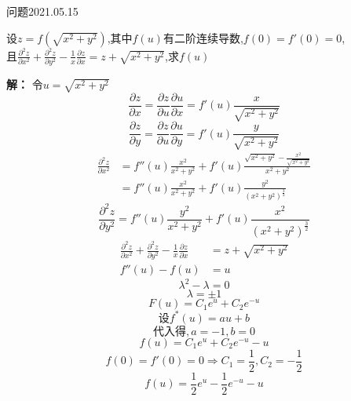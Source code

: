 \begin{mybox}{问题2021.05.15}
	
	\qquad 设$z=f(\sqrt{x^2+y^2})$,其中$f(u)$有二阶连续导数,$f(0)=f'(0)=0$,\\
	且$\frac{\partial^2 z}{\partial x^2}+\frac{\partial^2 z}{\partial y^2}-\frac{1}{x}\frac{\partial z}{\partial x}=z+\sqrt{x^2+y^2}$,求$f(u)$
\end{mybox}
\noindent
\textbf{解：}
令$u=\sqrt{x^2+y^2}$
$$\frac{\partial z}{\partial x}=\frac{\partial z}{\partial u}\frac{\partial u}{\partial x} = f'(u)\frac{x}{\sqrt{x^2+y^2}}$$
$$\frac{\partial z}{\partial y}=\frac{\partial z}{\partial u}\frac{\partial u}{\partial y} = f'(u)\frac{y}{\sqrt{x^2+y^2}}$$
\begin{align*}
\frac{\partial^2 z}{\partial x^2}&=f''(u) \frac{x^2}{x^2+y^2}+f'(u)\frac{\sqrt{x^2+y^2} -\frac{x^2}{\sqrt{x^2+y^2}}}{x^2+y^2}\\
&=f''(u)\frac{x^2}{x^2+y^2}+f'(u)\frac{y^2}{(x^2+y^2)^{\frac{3}{2}}}
\end{align*}
$$\frac{\partial^2 z}{\partial y^2}=f''(u)\frac{y^2}{x^2+y^2}+f'(u)\frac{x^2}{(x^2+y^2)^{\frac{3}{2}}}$$
\begin{align*}
\frac{\partial^2 z}{\partial x^2}+\frac{\partial^2 z}{\partial y^2}-\frac{1}{x}\frac{\partial z}{\partial x}&=z+\sqrt{x^2+y^2}\\
f''(u)-f(u)&=u
\end{align*}
$$\lambda^2-\lambda=0$$
$$\lambda = \pm 1$$
$$ F(u)=C_{1} e^{u}+C_{2}e^{-u}$$
$$\text{设}f^{*}(u)=au+b$$
$$\text{代入得},a=-1,b=0$$
$$f(u)=C_{1} e^{u}+C_{2}e^{-u}-u$$
$$f(0)=f'(0)=0\Rightarrow C_{1}=\frac{1}{2},C_{2}=-\frac{1}{2}$$
$$f(u)=\frac{1}{2}e^{u}-\frac{1}{2}e^{-u} -u$$
